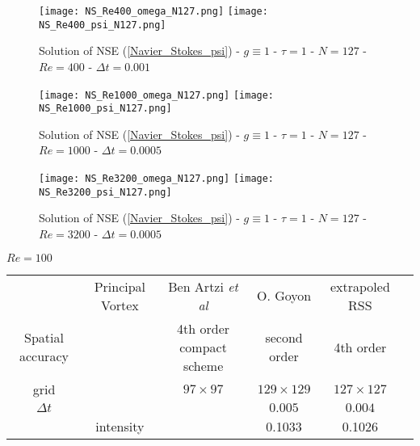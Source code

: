 \documentclass[11pt]{article}
\begin{document}
{\begin{figure}[!h]
\begin{center}
\texttt{[image: NS\_Re400\_omega\_N127.png]}
\texttt{[image: NS\_Re400\_psi\_N127.png]}\\
\caption{Solution of NSE  (\ref{Navier_Stokes_psi}) - $g \equiv 1$ - $\tau = 1$ -  $N=127$ - $Re = 400$ - $\Delta t = 0.001$}
\label{NS_Re400}
\end{center}
\end{figure}

\begin{figure}[!h]
\begin{center}
\texttt{[image: NS\_Re1000\_omega\_N127.png]}
\texttt{[image: NS\_Re1000\_psi\_N127.png]}\\
\caption{Solution of NSE (\ref{Navier_Stokes_psi}) - $g \equiv 1$ - $\tau = 1$ -  $N=127$ - $Re = 1000$ - $\Delta t = 0.0005$}
\label{NS_Re1000}
\end{center}
\end{figure}

\begin{figure}[!h]
\begin{center}
\texttt{[image: NS\_Re3200\_omega\_N127.png]}
\texttt{[image: NS\_Re3200\_psi\_N127.png]}\\
\caption{Solution of NSE (\ref{Navier_Stokes_psi}) - $g \equiv 1$ - $\tau = 1$ -  $N=127$ - $Re = 3200$ - $\Delta t = 0.0005$}
\label{NS_Re3200}
\end{center}
\end{figure}
\begin{table}[!h]
\begin{center}

\vspace{0.5cm}

$Re=100$


\begin{tabular}{| c|c|c|c|c|c | }
\hline 
 & Principal Vortex  & Ben Artzi {\it et al} \cite{BenArtziCroisille} & O. Goyon \cite{Goyon} & extrapoled RSS \\ 
Spatial accuracy &                  & 4th order compact scheme                        & second order      &   4th order          \\
\hline 
grid &   & $97 \times 97$ & $ 129 \times 129$ & $127 \times 127$ \\ 
\hline
$\Delta t$ & & &$0.005$ & $0.004$\\
\hline
&  intensity &     & 0.1033 & 0.1026 \\ 
 

\end{tabular}
\end{center}
\end{table}}
\end{document}
